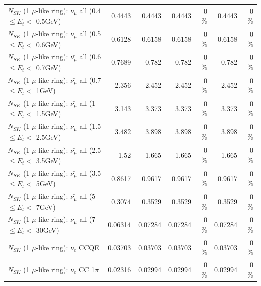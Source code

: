 \begin{table}
\begin{tabular}{| l | r | r | r  r | r  r |}
 $N_{SK}$ (1 $\mu$-like ring): $\bar{\nu_{\mu}}$ all (0.4 $\leq E_{t} <$ 0.5GeV) &          0.4443 &          0.4443 &          0.4443 &        0 \%  &          0.4443 &        0 \%  \\ 
 $N_{SK}$ (1 $\mu$-like ring): $\bar{\nu_{\mu}}$ all (0.5 $\leq E_{t} <$ 0.6GeV) &          0.6128 &          0.6158 &          0.6158 &        0 \%  &          0.6158 &        0 \%  \\ 
 $N_{SK}$ (1 $\mu$-like ring): $\bar{\nu_{\mu}}$ all (0.6 $\leq E_{t} <$ 0.7GeV) &          0.7689 &           0.782 &           0.782 &        0 \%  &           0.782 &        0 \%  \\ 
   $N_{SK}$ (1 $\mu$-like ring): $\bar{\nu_{\mu}}$ all (0.7 $\leq E_{t} <$ 1GeV) &           2.356 &           2.452 &           2.452 &        0 \%  &           2.452 &        0 \%  \\ 
   $N_{SK}$ (1 $\mu$-like ring): $\bar{\nu_{\mu}}$ all (1 $\leq E_{t} <$ 1.5GeV) &           3.143 &           3.373 &           3.373 &        0 \%  &           3.373 &        0 \%  \\ 
 $N_{SK}$ (1 $\mu$-like ring): $\bar{\nu_{\mu}}$ all (1.5 $\leq E_{t} <$ 2.5GeV) &           3.482 &           3.898 &           3.898 &        0 \%  &           3.898 &        0 \%  \\ 
 $N_{SK}$ (1 $\mu$-like ring): $\bar{\nu_{\mu}}$ all (2.5 $\leq E_{t} <$ 3.5GeV) &            1.52 &           1.665 &           1.665 &        0 \%  &           1.665 &        0 \%  \\ 
   $N_{SK}$ (1 $\mu$-like ring): $\bar{\nu_{\mu}}$ all (3.5 $\leq E_{t} <$ 5GeV) &          0.8617 &          0.9617 &          0.9617 &        0 \%  &          0.9617 &        0 \%  \\ 
     $N_{SK}$ (1 $\mu$-like ring): $\bar{\nu_{\mu}}$ all (5 $\leq E_{t} <$ 7GeV) &          0.3074 &          0.3529 &          0.3529 &        0 \%  &          0.3529 &        0 \%  \\ 
    $N_{SK}$ (1 $\mu$-like ring): $\bar{\nu_{\mu}}$ all (7 $\leq E_{t} <$ 30GeV) &         0.06314 &         0.07284 &         0.07284 &        0 \%  &         0.07284 &        0 \%  \\ 
\hline
\hline
\hline
                                      $N_{SK}$ (1 $\mu$-like ring): $\nu_e$ CCQE &         0.03703 &         0.03703 &         0.03703 &        0 \%  &         0.03703 &        0 \%  \\ 
                                 $N_{SK}$ (1 $\mu$-like ring): $\nu_e$ CC 1$\pi$ &         0.02316 &         0.02994 &         0.02994 &        0 \%  &         0.02994 &        0 \%  \\ 

\end{tabular}
\end{table}
